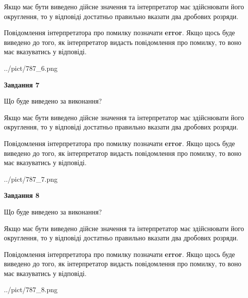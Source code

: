 \documentclass[12pt, ukrainian]{article}
\begin{document}
{\begin {Large}
Якщо має бути виведено дійсне значення та інтерпретатор має здійснювати його округлення, 
то у відповіді достатньо правильно вказати два дробових розряди.

Повідомлення інтерпретатора про помилку позначати \textbf{error}.
Якщо щось буде виведено до того, як інтерпретатор видасть повідомлення про помилку, 
то воно має вказуватись у відповіді. \par

\begin{center}
	{../pict/787_6.png}
\end{center}
\newpage

{\begin {center}\textbf{Завдання 7}\end {center}}\par
Що буде виведено за виконання? \par

Якщо має бути виведено дійсне значення та інтерпретатор має здійснювати його округлення, 
то у відповіді достатньо правильно вказати два дробових розряди.

Повідомлення інтерпретатора про помилку позначати \textbf{error}.
Якщо щось буде виведено до того, як інтерпретатор видасть повідомлення про помилку, 
то воно має вказуватись у відповіді. \par

\begin{center}
	{../pict/787_7.png}
\end{center}
\newpage

{\begin {center}\textbf{Завдання 8}\end {center}}\par
Що буде виведено за виконання? \par

Якщо має бути виведено дійсне значення та інтерпретатор має здійснювати його округлення, 
то у відповіді достатньо правильно вказати два дробових розряди.

Повідомлення інтерпретатора про помилку позначати \textbf{error}.
Якщо щось буде виведено до того, як інтерпретатор видасть повідомлення про помилку, 
то воно має вказуватись у відповіді. \par

\begin{center}
	{../pict/787_8.png}
\end{center}
\newpage


\end{Large}}
\end{document}
